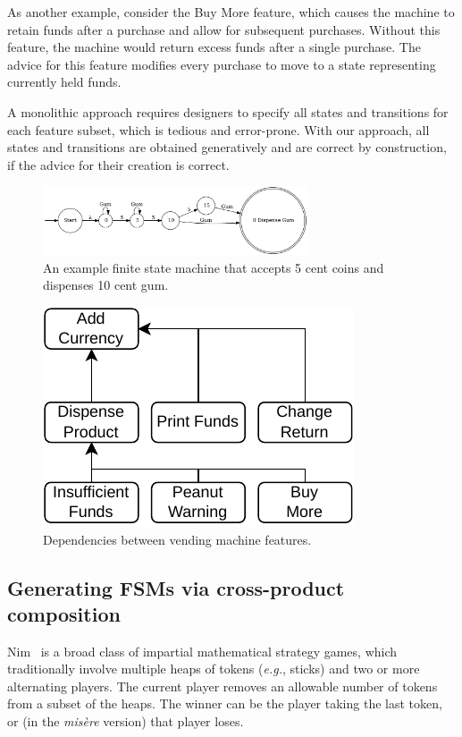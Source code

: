 \documentclass[sigplan,anonymous,review]{acmart}
\begin{document}
As another example, consider the Buy More feature, which causes the machine to retain funds after a purchase and allow for subsequent purchases.  Without this feature, the machine would return excess funds after a single purchase.  The advice for this feature modifies every purchase to move to a state representing currently held funds.

A monolithic approach requires designers to specify all states and transitions for each feature subset, which is tedious and error-prone. With our approach, all states and transitions are obtained generatively and are correct by construction, if the advice for their creation is correct.

\begin{figure}
    \centering
    \includegraphics[width=0.7\textwidth]{figures/vend1.pdf}
    \caption{An example finite state machine that accepts 5 cent coins and dispenses 10 cent gum.}
    \label{fig:vend1}
\end{figure}

\begin{figure}
    \centering
    \includegraphics[width=0.5\linewidth]{figures/VendingMachine.pdf}
    \caption{Dependencies between vending machine features.}
    \label{fig:vmDependencies}
\end{figure}

\subsection{Generating FSMs via cross-product composition}\label{sec:nim}

Nim~\cite{nim} is a broad class of impartial mathematical strategy games, which traditionally involve multiple heaps of tokens (\textit{e.g.}, sticks) and two or more alternating players. The current player removes an allowable number of tokens from a subset of the heaps. The winner can be the player taking the last token, or (in the \textit{mis\`{e}re} version) that player loses.
\end{document}
